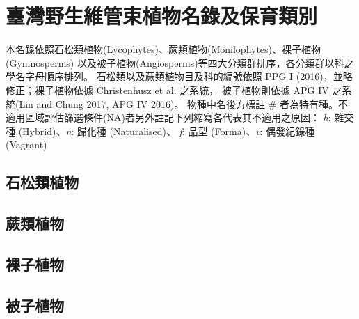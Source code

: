 \chapter{臺灣野生維管束植物名錄及保育類別}

\begin{small}
\linespread{1.5}\selectfont
本名錄依照石松類植物(Lycophytes)、蕨類植物(Monilophytes)、裸子植物(Gymnosperms)
以及被子植物(Angiosperms)等四大分類群排序，各分類群以科之學名字母順序排列。
石松類以及蕨類植物目及科的編號依照 PPG I (2016)，並略修正；裸子植物依據
Christenhusz et al. \citeyearpar{Christenhusz:2011wm}之系統，
被子植物則依據 APG IV 之系統(Lin and Chung 2017, APG IV 2016)。
物種中名後方標註 \# 者為特有種。不適用區域評估篩選條件(NA)者另外註記下列縮寫各代表其不適用之原因：
\textit{h}: 雜交種 (Hybrid)、\textit{n}: 歸化種 (Naturalised)、
\textit{f}: 品型 (Forma)、\textit{v}: 偶發紀錄種 (Vagrant) \\
\end{small}

\begin{flushleft}
    \begin{multicols}{2}
    \linespread{1}\selectfont
    \section{石松類植物}
    
    \section{蕨類植物}
    
    \section{裸子植物}
    
    \section{被子植物}
    
    \end{multicols}
\end{flushleft}
